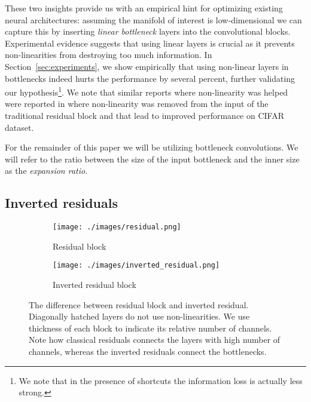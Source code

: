 \documentclass[10pt,twocolumn,letterpaper]{article}
\begin{document}
These two insights provide us with an empirical hint for optimizing existing neural architectures: assuming the manifold of interest is low-dimensional we can capture this by inserting {\em linear bottleneck} layers into the convolutional blocks.
Experimental evidence suggests that using linear layers is crucial as it prevents non-linearities from destroying too much information.
In Section~\ref{sec:experiments}, we show empirically that using non-linear layers in bottlenecks indeed hurts the performance by several percent, further validating our hypothesis\footnote{We note that in the presence of shortcuts the information loss is actually less strong.}. We note that similar reports where non-linearity was helped were reported in \cite{DeepPyramidalNetworks} where non-linearity was removed from the input of the traditional residual block and that lead to improved performance on CIFAR dataset.


For the remainder of this paper we will be utilizing bottleneck convolutions.
We will refer to the ratio between the size of the input bottleneck and the inner size as the \emph{expansion ratio}.

\subsection{Inverted residuals}
\begin{figure}
  \begin{subfigure}[t]{.22\textwidth}
\caption {Residual block}
    \texttt{[image: ./images/residual.png]}
  \end{subfigure}
  \begin{subfigure}[t]{.22\textwidth}
\caption {Inverted residual block}
    \texttt{[image: ./images/inverted\_residual.png]}
    \label{fig:bottleneck-residual-block}
  \end{subfigure}
  \caption{
    The difference between residual block \cite{ResNet, ResNext2016} and inverted residual.
    Diagonally hatched layers do not use non-linearities.
    We use thickness of each block to indicate its relative number of channels.
    Note how classical residuals connects the layers with high number of channels, whereas the inverted residuals connect the bottlenecks. \beveco
  }
  \label{fig:bottleneck_with_residuals} 
\end{figure}
\end{document}
